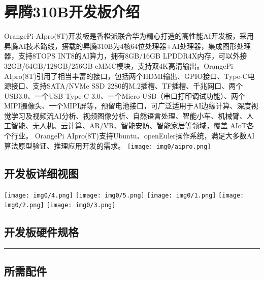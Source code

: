 \hypertarget{ux6607ux817e310bux5f00ux53d1ux677fux4ecbux7ecd}{%
\section{昇腾310B开发板介绍}\label{ux6607ux817e310bux5f00ux53d1ux677fux4ecbux7ecd}}

OrangePi
AIpro(8T)开发板是香橙派联合华为精心打造的高性能AI开发板，采用昇腾AI技术路线，搭载的昇腾310B为4核64位处理器+AI处理器，集成图形处理器，支持8TOPS
INT8的AI算力，拥有8GB/16GB LPDDR4X内存，可以外接32GB/64GB/128GB/256GB
eMMC模块，支持双4K高清输出。OrangePi
AIpro(8T)引用了相当丰富的接口，包括两个HDMI输出、GPIO接口、Type-C电源接口、支持SATA/NVMe
SSD 2280的M.2插槽、TF插槽、千兆网口、两个USB3.0、一个USB Type-C
3.0、一个Micro
USB（串口打印调试功能）、两个MIPI摄像头、一个MIPI屏等，预留电池接口，可广泛适用于AI边缘计算、深度视觉学习及视频流AI分析、视频图像分析、自然语言处理、智能小车、机械臂、人工智能、无人机、云计算、AR/VR、智能安防、智能家居等领域，覆盖
AIoT各个行业。 OrangePi
AIpro(8T)支持Ubuntu、openEuler操作系统，满足大多数AI算法原型验证、推理应用开发的需求。
\texttt{[image: img0/aipro.png]}

\hypertarget{ux5f00ux53d1ux677fux8be6ux7ec6ux89c6ux56fe}{%
\subsection{开发板详细视图}\label{ux5f00ux53d1ux677fux8be6ux7ec6ux89c6ux56fe}}

\texttt{[image: img0/4.png]} \texttt{[image: img0/5.png]}
\texttt{[image: img0/1.png]} \texttt{[image: img0/2.png]}
\texttt{[image: img0/3.png]}

\hypertarget{ux5f00ux53d1ux677fux786cux4ef6ux89c4ux683c}{%
\subsection{开发板硬件规格}\label{ux5f00ux53d1ux677fux786cux4ef6ux89c4ux683c}}

\begin{center}\rule{0.5\linewidth}{0.5pt}\end{center}

\hypertarget{ux6240ux9700ux914dux4ef6}{%
\subsection{所需配件}\label{ux6240ux9700ux914dux4ef6}}

